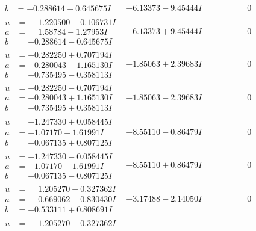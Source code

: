 \documentclass[1p]{elsarticle_modified}
\theoremstyle{definition}
\begin{document}
$$\begin{array}{c|c|c}
\begin{aligned}
b &= -0.288614 + 0.645675 I\end{aligned}
 & -6.13373 - 9.45444 I & \phantom{-0.000000 } 0 \\ \hline\begin{aligned}
u &= \phantom{-}1.220500 - 0.106731 I \\
a &= \phantom{-}1.58784 - 1.27953 I \\
b &= -0.288614 - 0.645675 I\end{aligned}
 & -6.13373 + 9.45444 I & \phantom{-0.000000 } 0 \\ \hline\begin{aligned}
u &= -0.282250 + 0.707194 I \\
a &= -0.280043 - 1.165130 I \\
b &= -0.735495 - 0.358113 I\end{aligned}
 & -1.85063 + 2.39683 I & \phantom{-0.000000 } 0 \\ \hline\begin{aligned}
u &= -0.282250 - 0.707194 I \\
a &= -0.280043 + 1.165130 I \\
b &= -0.735495 + 0.358113 I\end{aligned}
 & -1.85063 - 2.39683 I & \phantom{-0.000000 } 0 \\ \hline\begin{aligned}
u &= -1.247330 + 0.058445 I \\
a &= -1.07170 + 1.61991 I \\
b &= -0.067135 + 0.807125 I\end{aligned}
 & -8.55110 - 0.86479 I & \phantom{-0.000000 } 0 \\ \hline\begin{aligned}
u &= -1.247330 - 0.058445 I \\
a &= -1.07170 - 1.61991 I \\
b &= -0.067135 - 0.807125 I\end{aligned}
 & -8.55110 + 0.86479 I & \phantom{-0.000000 } 0 \\ \hline\begin{aligned}
u &= \phantom{-}1.205270 + 0.327362 I \\
a &= \phantom{-}0.669062 + 0.830430 I \\
b &= -0.533111 + 0.808691 I\end{aligned}
 & -3.17488 - 2.14050 I & \phantom{-0.000000 } 0 \\ \hline\begin{aligned}
u &= \phantom{-}1.205270 - 0.327362 I \\

\end{aligned}
\end{array}$$
\end{document}
